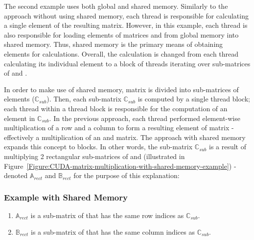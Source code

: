 The second example uses both global and shared memory. Similarly to the approach without using shared memory, each thread is responsible for calculating a single element of the resulting  matrix. However, in this example, each thread is also responsible for loading elements of matrices  and  from global memory into shared memory. Thus, shared memory is the primary means of obtaining elements for calculations. Overall, the calculation is changed from each thread calculating its individual element to a block of threads iterating over sub-matrices of  and . \\
\par In order to make use of shared memory, matrix  is divided into sub-matrices of  elements ($ \mathbb{C}_{sub} $). Then, each sub-matrix $ \mathbb{C}_{sub} $ is computed by a single thread block; each thread within a thread block is responsible for the computation of an element in $ \mathbb{C}_{sub} $. In the previous approach, each thread performed element-wise multiplication of a row and a column to form a resulting element of matrix  - effectively a multiplication of an  and  matrix. The approach with shared memory expands this concept to blocks. In other words, the sub-matrix $ \mathbb{C}_{sub} $ is a result of multiplying 2 rectangular sub-matrices of  and  (illustrated in Figure~\ref{Figure:CUDA-matrix-multiplication-with-shared-memory-example}) - denoted $ \mathbb{A}_{rect} $ and $ \mathbb{B}_{rect} $ for the purpose of this explanation:
\subsubsection{Example with Shared Memory}\label{Subsubsection:CUDA-matrix-multiplication-example-with-shared-memory}

\begin{enumerate}
	\item $ \mathbb{A}_{rect} $ is a  sub-matrix of  that has the same row indices as $ \mathbb{C}_{sub} $.
	\item $ \mathbb{B}_{rect} $ is a  sub-matrix of  that has the same column indices as $ \mathbb{C}_{sub} $.
\end{enumerate}

